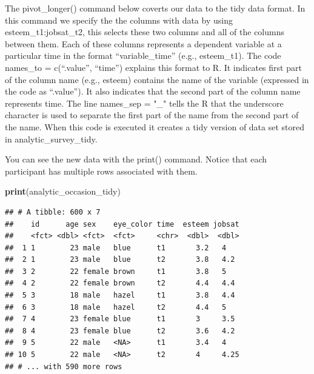 \documentclass[
]{krantz}
\makeatletter
\newenvironment{Shaded}{\begin{snugshade}}{\end{snugshade}}
\newcommand{\DataTypeTok}[1]{\textcolor[rgb]{0.27,0.27,0.27}{#1}}
\newcommand{\KeywordTok}[1]{\textcolor[rgb]{0.27,0.27,0.27}{\textbf{#1}}}
\newcommand{\NormalTok}[1]{#1}
\newcommand{\OperatorTok}[1]{\textcolor[rgb]{0.43,0.43,0.43}{\textbf{#1}}}
\newcommand{\StringTok}[1]{\textcolor[rgb]{0.5,0.5,0.5}{#1}}
\newenvironment{kframe}{%
\medskip{}
\setlength{\fboxsep}{.8em}
 \def\at@end@of@kframe{}%
 \ifinner\ifhmode%
  \def\at@end@of@kframe{\end{minipage}}%
  \begin{minipage}{\columnwidth}%
 \fi\fi%
 \def\FrameCommand##1{\hskip\@totalleftmargin \hskip-\fboxsep
 \colorbox{shadecolor}{##1}\hskip-\fboxsep
     \hskip-\linewidth \hskip-\@totalleftmargin \hskip\columnwidth}%
 \MakeFramed {\advance\hsize-\width
   \@totalleftmargin\z@ \linewidth\hsize
   \@setminipage}}%
 {\par\unskip\endMakeFramed%
 \at@end@of@kframe}
\renewenvironment{Shaded}{\begin{kframe}}{\end{kframe}}
\makeatother
\begin{document}
The pivot\_longer() command below coverts our data to the tidy data format. In this command we specify the the columns with data by using esteem\_t1:jobsat\_t2, this selects these two columns and all of the columns between them. Each of these columns represents a dependent variable at a particular time in the format ``variable\_time'' (e.g., esteem\_t1). The code names\_to = c(``.value'', ``time'') explains this format to R. It indicates first part of the column name (e.g., esteem) contains the name of the variable (expressed in the code as ``.value''). It also indicates that the second part of the column name represents time. The line names\_sep = "\_" tells the R that the underscore character is used to separate the first part of the name from the second part of the name. When this code is executed it creates a tidy version of data set stored in analytic\_survey\_tidy.

\begin{Shaded}
\end{Shaded}

You can see the new data with the print() command. Notice that each participant has multiple rows associated with them.

\begin{Shaded}
\begin{Highlighting}[]
\KeywordTok{print}\NormalTok{(analytic_occasion_tidy)}
\end{Highlighting}
\end{Shaded}

\begin{verbatim}
## # A tibble: 600 x 7
##    id      age sex    eye_color time  esteem jobsat
##    <fct> <dbl> <fct>  <fct>     <chr>  <dbl>  <dbl>
##  1 1        23 male   blue      t1       3.2   4   
##  2 1        23 male   blue      t2       3.8   4.2 
##  3 2        22 female brown     t1       3.8   5   
##  4 2        22 female brown     t2       4.4   4.4 
##  5 3        18 male   hazel     t1       3.8   4.4 
##  6 3        18 male   hazel     t2       4.4   5   
##  7 4        23 female blue      t1       3     3.5 
##  8 4        23 female blue      t2       3.6   4.2 
##  9 5        22 male   <NA>      t1       3.4   4   
## 10 5        22 male   <NA>      t2       4     4.25
## # ... with 590 more rows
\end{verbatim}
\end{document}
